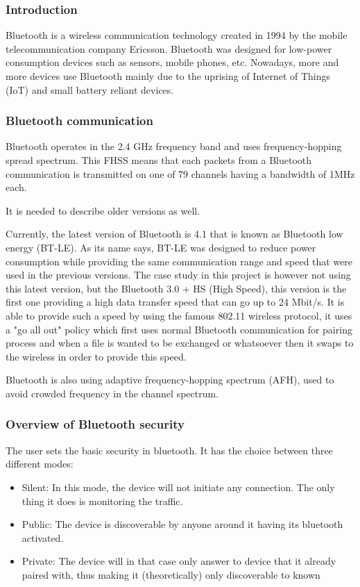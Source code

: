 \subsubsection{Introduction}
Bluetooth is a wireless communication technology created in 1994 by the mobile telecommunication company Ericsson. Bluetooth was designed for low-power consumption devices such as sensors, mobile phones, etc. Nowadays, more and more devices use Bluetooth mainly due to the uprising of Internet of Things (IoT) and small battery reliant devices.

\subsubsection{Bluetooth communication}
Bluetooth operates in the 2.4 GHz frequency band and uses frequency-hopping spread spectrum. This FHSS means that each packets from a Bluetooth communication is transmitted on one of 79 channels having a bandwidth of 1MHz each. 

It is needed to describe older versions as well.

Currently, the latest version of Bluetooth is 4.1 that is known as Bluetooth low energy (BT-LE). As its name says, BT-LE was designed to reduce power consumption while providing the same communication range and speed that were used in the previous versions. 
The case study in this project is however not using this latest version, but the Bluetooth 3.0 + HS (High Speed), this version is  the first one providing a high data transfer speed that can go up to 24 Mbit/s. It is able to provide such a speed by using the famous 802.11 wireless protocol, it uses a "go all out" policy which first uses normal Bluetooth communication for pairing process and when a file is wanted to be exchanged or whatsoever then it swaps to the wireless in order to provide this speed.

Bluetooth is also using adaptive frequency-hopping spectrum (AFH), used to avoid crowded frequency in the channel spectrum.

\subsubsection{Overview of Bluetooth security}

The user sets the basic security in bluetooth. It has the choice between three different modes:
 \begin{itemize}
 	\item Silent: In this mode, the device will not initiate any connection. The only thing it does is monitoring the traffic.
 	\item Public: The device is discoverable by anyone around it having its bluetooth activated.
 	\item Private: The device will in that case only answer to device that it already paired with, thus making it (theoretically) only discoverable to known 
 \end{itemize}

